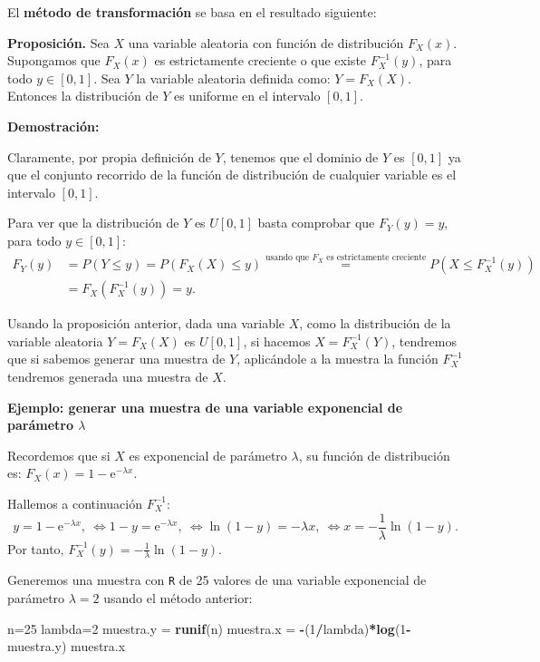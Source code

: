 \documentclass[]{book}
\newenvironment{Shaded}{\begin{snugshade}}{\end{snugshade}}
\newcommand{\DecValTok}[1]{\textcolor[rgb]{0.00,0.00,0.81}{#1}}
\newcommand{\KeywordTok}[1]{\textcolor[rgb]{0.13,0.29,0.53}{\textbf{#1}}}
\newcommand{\NormalTok}[1]{#1}
\newcommand{\OperatorTok}[1]{\textcolor[rgb]{0.81,0.36,0.00}{\textbf{#1}}}
\newcommand{\StringTok}[1]{\textcolor[rgb]{0.31,0.60,0.02}{#1}}
\begin{document}
El \textbf{método de transformación} se basa en el resultado siguiente:

\textbf{Proposición.}
Sea \(X\) una variable aleatoria con función de distribución \(F_X(x)\). Supongamos que \(F_X(x)\) es estrictamente creciente o que existe \(F_X^{-1}(y)\), para todo \(y\in [0,1]\). Sea \(Y\) la variable aleatoria definida como: \(Y=F_X(X)\). Entonces la distribución de \(Y\) es uniforme en el intervalo \([0,1]\).

\textbf{Demostración:}

Claramente, por propia definición de \(Y\), tenemos que el dominio de \(Y\) es \([0,1]\) ya que el conjunto recorrido de la función de distribución de cualquier variable es el intervalo \([0,1]\).

Para ver que la distribución de \(Y\) es \(U[0,1]\) basta comprobar que \(F_Y(y)=y\), para todo \(y\in [0,1]\):
\[
\begin{array}{rl}
F_Y(y) & =P(Y\leq y)=P(F_X(X)\leq y)\stackrel{\mbox{usando que $F_X$ es estrictamente creciente}}{=} P(X\leq F_X^{-1}(y)) \\ & =F_X(F_X^{-1}(y))=y.
\end{array}
\]

Usando la proposición anterior, dada una variable \(X\), como la distribución de la variable aleatoria \(Y=F_X(X)\) es \(U[0,1]\), si hacemos \(X=F_X^{-1}(Y)\), tendremos que si sabemos generar una muestra de \(Y\), aplicándole a la muestra la función \(F_X^{-1}\) tendremos generada una muestra de \(X\).

\textbf{Ejemplo: generar una muestra de una variable exponencial de parámetro \(\lambda\)}

Recordemos que si \(X\) es exponencial de parámetro \(\lambda\), su función de distribución es: \(F_X(x)=1-\mathrm{e}^{-\lambda x}\).

Hallemos a continuación \(F_X^{-1}\):
\[
y=1-\mathrm{e}^{-\lambda x},\ \Leftrightarrow 1-y=\mathrm{e}^{-\lambda x},\ \Leftrightarrow \ln(1-y)=-\lambda x,\ \Leftrightarrow x=-\frac{1}{\lambda}\ln(1-y).
\]
Por tanto, \(F_X^{-1}(y)=-\frac{1}{\lambda}\ln(1-y)\).

Generemos una muestra con \texttt{R} de 25 valores de una variable exponencial de parámetro \(\lambda=2\) usando el método anterior:

\begin{Shaded}
\begin{Highlighting}[]
\NormalTok{n=}\DecValTok{25}
\NormalTok{lambda=}\DecValTok{2}
\NormalTok{muestra.y =}\StringTok{ }\KeywordTok{runif}\NormalTok{(n)}
\NormalTok{muestra.x =}\StringTok{ }\OperatorTok{-}\NormalTok{(}\DecValTok{1}\OperatorTok{/}\NormalTok{lambda)}\OperatorTok{*}\KeywordTok{log}\NormalTok{(}\DecValTok{1}\OperatorTok{-}\NormalTok{muestra.y)}
\NormalTok{muestra.x}
\end{Highlighting}
\end{Shaded}
\end{document}
